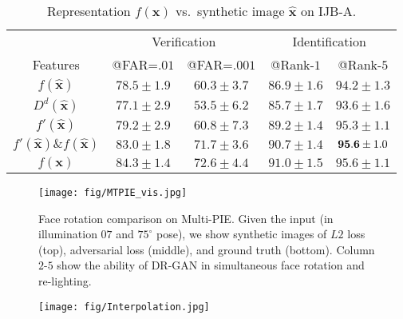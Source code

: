 \documentclass[10pt,journal,compsoc]{IEEEtran}
\begin{document}
\begin{table}[t!]
\caption{\small{Representation $f(\mathbf{x})$  vs.~synthetic image $\hat{\mathbf{x}}$ on IJB-A.}}
\vspace{-3mm}
\small
\begin{center}
\begin{tabular}{@{\hskip .5mm}c@{\hskip 1.5mm}c@{\hskip 1.5mm}c@{\hskip 1.5mm}c@{\hskip 1.5mm}c@{\hskip .5mm}}
\toprule
& \multicolumn{2}{c}{Verification} & \multicolumn{2}{c}{Identification} \\ \cmidrule(r){2-3} \cmidrule(r){4-5}
Features & @FAR=$.01$ & @FAR=$.001$ & @Rank-$1$ & @Rank-$5$ \\ \midrule
$f(\hat{\mathbf{x}})$ &  $78.5 \pm 1.9$ & $60.3 \pm 3.7$ & $86.9\pm1.6$ & $94.2\pm1.3$   \\
$D^d(\hat{\mathbf{x}})$ & $77.1 \pm 2.9$ & $53.5 \pm 6.2$ & $85.7\pm1.7$ & $93.6\pm1.6$\\
$f'(\hat{\mathbf{x}})$ & $79.2 \pm 2.9$ & $60.8 \pm 7.3$ & $89.2\pm1.4$ & $95.3\pm1.1$\\
$f'(\hat{\mathbf{x}}) \& f(\hat{\mathbf{x}})$ & $83.0 \pm 1.8$ & $71.7 \pm 3.6$ & $90.7\pm1.4$ & ${\bf{95.6}}\pm1.0$\\
$f(\mathbf{x})$ & $\mathbf{84.3}\pm1.4$ & $\mathbf{72.6}\pm4.4$ & $\mathbf{91.0}\pm1.5$ & $\mathbf{95.6}\pm1.1$ \\ \bottomrule
\end{tabular}
\end{center}
\eqnvspace
\label{tab:ijb-a_multi-cue}
\vspace{-2mm}
\end{table}\begin{figure*}[t!]
\begin{center}
\texttt{[image: fig/MTPIE\_vis.jpg]}
\vspace{-2mm}
\caption{\small Face rotation comparison on Multi-PIE. Given the input (in illumination $07$ and $75^\circ$ pose), we show synthetic images of $L2$ loss (top), adversarial loss (middle), and ground truth (bottom). Column $2$-$5$ show the ability of DR-GAN in simultaneous face rotation and re-lighting.} \vspace{-1mm}
\label{fig:GANvsL2}
\end{center}
\end{figure*}\vspace{-2mm}\begin{figure*}[t!]
  \begin{center}
  \small
\texttt{[image: fig/Interpolation.jpg]} 

\end{center}
\end{figure*}
\end{document}
